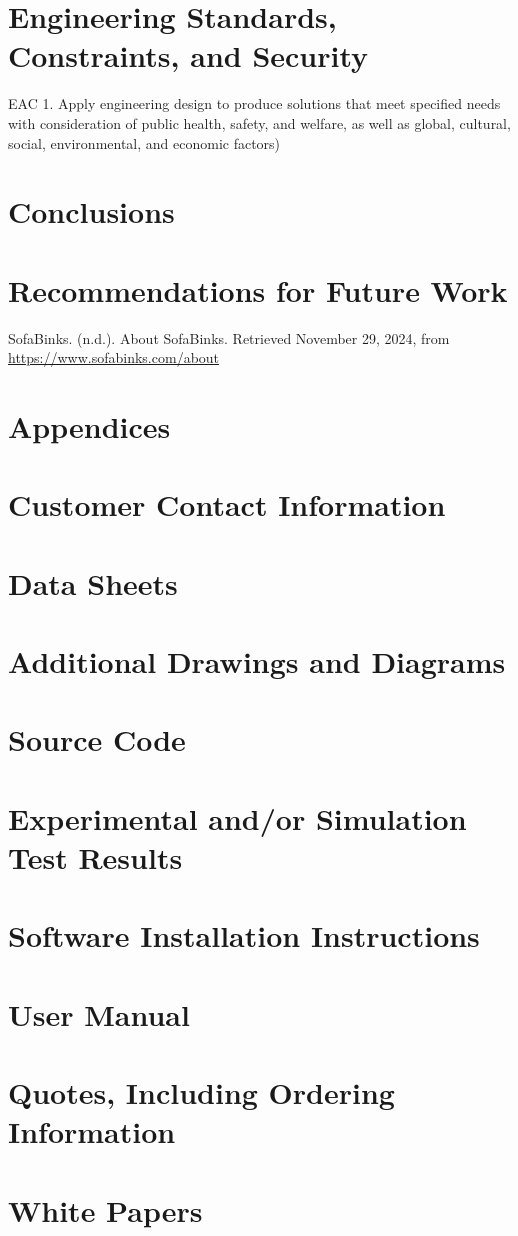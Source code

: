 \documentclass{article}
\begin{document}
\section{Engineering Standards, Constraints, and Security}
EAC 1. Apply engineering design to produce solutions that meet specified needs with consideration of public health, 
safety, and welfare, as well as global, cultural, social, environmental, and economic 
factors) 
\section{Conclusions}

\section{Recommendations for Future Work}

\begin{thebibliography}{99}
 SofaBinks. (n.d.). 
    About SofaBinks. Retrieved November 29, 2024, from \url{https://www.sofabinks.com/about}
\end{thebibliography}


\newpage
\section*{Appendices} %
\appendix
\section{Customer Contact Information}
\section{Data Sheets}
\section{Additional Drawings and Diagrams}
\section{Source Code} 
\section{Experimental and/or Simulation Test Results} 
\section{Software Installation Instructions} 
\section{User Manual} 
\section{Quotes, Including Ordering Information} 
\section{White Papers} 
\end{document}
